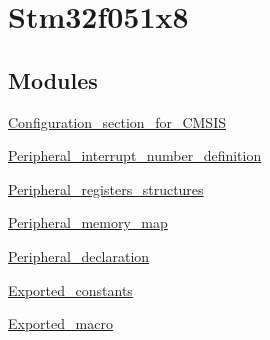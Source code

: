 \hypertarget{group__stm32f051x8}{}\section{Stm32f051x8}
\label{group__stm32f051x8}
\subsection*{Modules}
\begin{DoxyCompactItemize}
\item 
\hyperlink{group___configuration__section__for___c_m_s_i_s}{Configuration\+\_\+section\+\_\+for\+\_\+\+C\+M\+S\+IS}
\item 
\hyperlink{group___peripheral__interrupt__number__definition}{Peripheral\+\_\+interrupt\+\_\+number\+\_\+definition}
\item 
\hyperlink{group___peripheral__registers__structures}{Peripheral\+\_\+registers\+\_\+structures}
\item 
\hyperlink{group___peripheral__memory__map}{Peripheral\+\_\+memory\+\_\+map}
\item 
\hyperlink{group___peripheral__declaration}{Peripheral\+\_\+declaration}
\item 
\hyperlink{group___exported__constants}{Exported\+\_\+constants}
\item 
\hyperlink{group___exported__macro}{Exported\+\_\+macro}
\end{DoxyCompactItemize}
